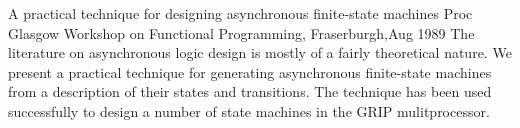 {A practical technique for designing asynchronous finite-state machines}
{Proc Glasgow Workshop on Functional Programming, Fraserburgh,Aug 1989}
{
The literature on asynchronous logic design is mostly of a fairly theoretical
nature.   We present a practical technique for generating asynchronous finite-state
machines from a description of their states and transitions.  The technique
has been used successfully to design a number of state machines in
the GRIP mulitprocessor.
}



